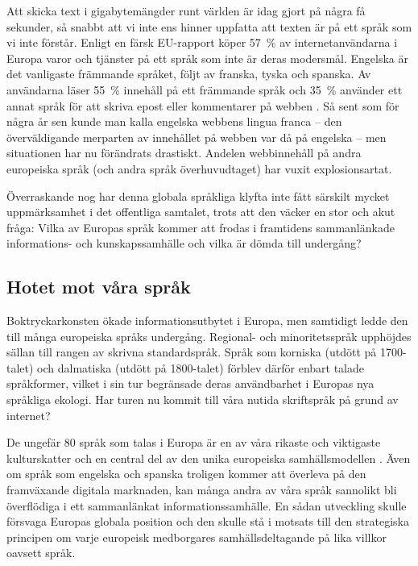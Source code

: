 \begin{multicols}{2}
Att skicka text i gigabytemängder runt världen är idag gjort på några
få sekunder, så snabbt att vi inte ens hinner uppfatta att texten är
på ett språk som vi inte förstår. Enligt en färsk EU-rapport köper
57~\% av internet\-an\-vänd\-ar\-na i Europa varor och tjänster på ett
språk som inte är deras modersmål. Engelska är det vanligaste
främmande språket, följt av franska, tyska och spanska. Av användarna
läser 55~\% innehåll på ett främmande språk och 35~\% använder ett
annat språk för att skriva epost eller kommentarer på webben \cite{EC1}. Så sent
som för några år sen kunde man kalla engelska webbens lingua franca --
den överväldigande merparten av innehållet på webben var då på
engelska -- men situationen har nu förändrats drastiskt. Andelen
webbinnehåll på andra europeiska språk (och andra språk
överhuvudtaget) har vuxit explosionsartat.

Överraskande nog har denna globala språkliga klyfta inte fått särskilt
mycket uppmärksamhet i det offentliga samtalet, trots att den väcker
en stor och akut fråga: Vilka av Europas språk kommer att frodas i
framtidens samman\-länkade informa\-tions- och kun\-skaps\-sam\-hälle
och vilka är dömda till undergång?


\subsection{Hotet mot våra språk}

Boktryckarkonsten ökade informations\-ut\-bytet i Europa, men
sam\-tidigt ledde den till många europeiska språks
under\-gång. Regional- och minoritets\-språk upphöjdes sällan till
rangen av skrivna standard\-språk. Språk som korniska (utdött på
1700-talet) och dalmatiska (utdött på 1800-talet) förblev därför
enbart talade språkformer, vilket i sin tur begränsade deras
användbarhet i Europas nya språkliga ekologi. Har turen nu kommit till
våra nutida skriftspråk på grund av internet?


De ungefär 80 språk som talas i Europa är en av våra rikaste och
viktigaste kulturskatter och en central del av den unika europeiska
samhällsmodellen \cite{EC2}. Även om språk som engelska och spanska troligen
kommer att överleva på den framväxande digitala marknaden, kan många
andra av våra språk sannolikt bli överflödiga i ett samman\-länkat
informa\-tions\-samhälle. En sådan utveckling skulle försvaga Europas
globala position och den skulle stå i motsats till den strategiska
principen om varje europeisk medborgares samhällsdeltagande på lika
villkor oavsett språk.


\end{multicols}
